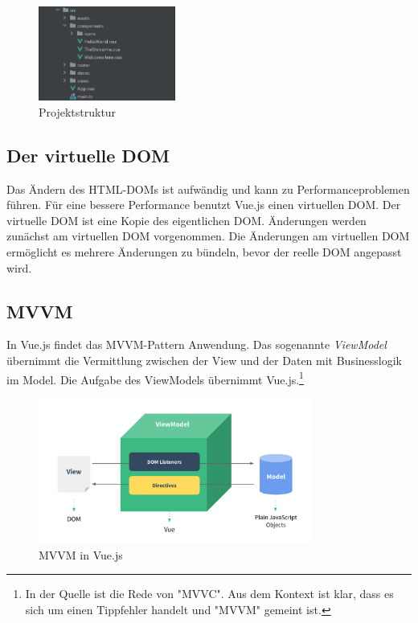 \begin{figure}[H]
  \centering
  \includegraphics[width=0.4\textwidth]{img/vueFileStructure}
  \caption{Projektstruktur}
  \label{fig:vueProjektstruktur}
\end{figure}

\subsection*{Der virtuelle DOM}
Das Ändern des HTML-DOMs ist aufwändig und kann zu Performanceproblemen führen.
Für eine bessere Performance benutzt Vue.js einen virtuellen DOM.
Der virtuelle DOM ist eine Kopie des eigentlichen DOM.
Änderungen werden zunächst am virtuellen DOM vorgenommen.
Die Änderungen am virtuellen DOM ermöglicht es mehrere Änderungen zu bündeln,
bevor der reelle DOM angepasst wird. \cite[S. 10-11]{steyer2019} %

\subsection*{MVVM}
In Vue.js findet das MVVM-Pattern Anwendung.
Das sogenannte \emph{ViewModel} übernimmt die Vermittlung zwischen der View
und der Daten mit Businesslogik im Model.
Die Aufgabe des ViewModels übernimmt Vue.js.\cite[S. 43]{steyer2019}\footnote{In der Quelle ist die Rede von "MVVC". Aus dem Kontext ist klar, dass es sich um einen Tippfehler handelt und "MVVM" gemeint ist.}

\begin{figure}[H]
  \centering
  \includegraphics[width=0.8\textwidth]{img/mvvm}
  \caption{MVVM in Vue.js \cite{gettingStarted012}}
  \label{fig:mvvm}
\end{figure}

